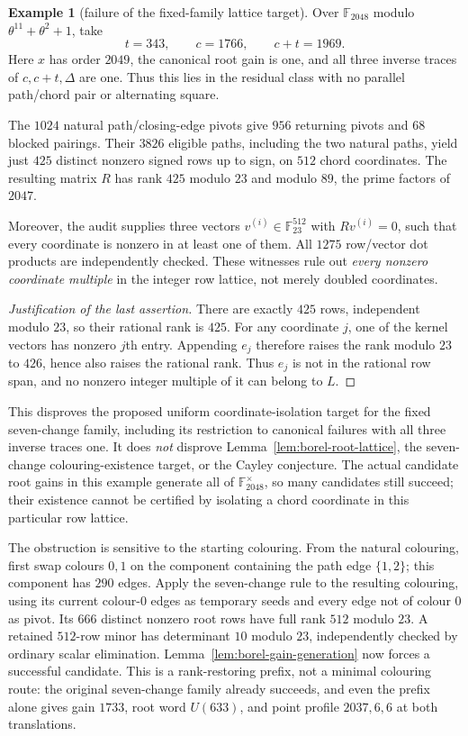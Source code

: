 \documentclass[11pt,a4paper]{article}
\theoremstyle{definition}
\newtheorem{example}[theorem]{Example}
\theoremstyle{remark}
\begin{document}
\begin{example}[failure of the fixed-family lattice target]\label{ex:borel-rank-obstruction}
Over $\mathbb F_{2048}$ modulo $\theta^{11}+\theta^2+1$, take
\[
                 t=343,\qquad c=1766,\qquad c+t=1969.
\]
Here $x$ has order $2049$, the canonical root gain is one, and all three inverse traces of $c,c+t,\Delta$ are one.  Thus this lies in the residual class with no parallel path/chord pair or alternating square.

The $1024$ natural path/closing-edge pivots give $956$ returning pivots and $68$ blocked pairings.  Their $3826$ eligible paths, including the two natural paths, yield just $425$ distinct nonzero signed rows up to sign, on $512$ chord coordinates.  The resulting matrix $R$ has rank $425$ modulo $23$ and modulo $89$, the prime factors of $2047$.

Moreover, the audit supplies three vectors $v^{(i)}\in\mathbb F_{23}^{512}$ with $Rv^{(i)}=0$, such that every coordinate is nonzero in at least one of them.  All $1275$ row/vector dot products are independently checked.  These witnesses rule out \emph{every nonzero coordinate multiple} in the integer row lattice, not merely doubled coordinates.
\end{example}
\begin{proof}[Justification of the last assertion]
There are exactly $425$ rows, independent modulo $23$, so their rational rank is $425$.  For any coordinate $j$, one of the kernel vectors has nonzero $j$th entry.  Appending $e_j$ therefore raises the rank modulo $23$ to $426$, hence also raises the rational rank.  Thus $e_j$ is not in the rational row span, and no nonzero integer multiple of it can belong to $L$.
\end{proof}

This disproves the proposed uniform coordinate-isolation target for the fixed seven-change family, including its restriction to canonical failures with all three inverse traces one.  It does \emph{not} disprove Lemma~\ref{lem:borel-root-lattice}, the seven-change colouring-existence target, or the Cayley conjecture.  The actual candidate root gains in this example generate all of $\mathbb F_{2048}^\times$, so many candidates still succeed; their existence cannot be certified by isolating a chord coordinate in this particular row lattice.

The obstruction is sensitive to the starting colouring.  From the natural colouring, first swap colours $0,1$ on the component containing the path edge $\{1,2\}$; this component has $290$ edges.  Apply the seven-change rule to the resulting colouring, using its current colour-$0$ edges as temporary seeds and every edge not of colour $0$ as pivot.  Its $666$ distinct nonzero root rows have full rank $512$ modulo $23$.  A retained $512$-row minor has determinant $10$ modulo $23$, independently checked by ordinary scalar elimination.  Lemma~\ref{lem:borel-gain-generation} now forces a successful candidate.  This is a rank-restoring prefix, not a minimal colouring route: the original seven-change family already succeeds, and even the prefix alone gives gain $1733$, root word $U(633)$, and point profile $2037,6,6$ at both translations.
\end{document}
